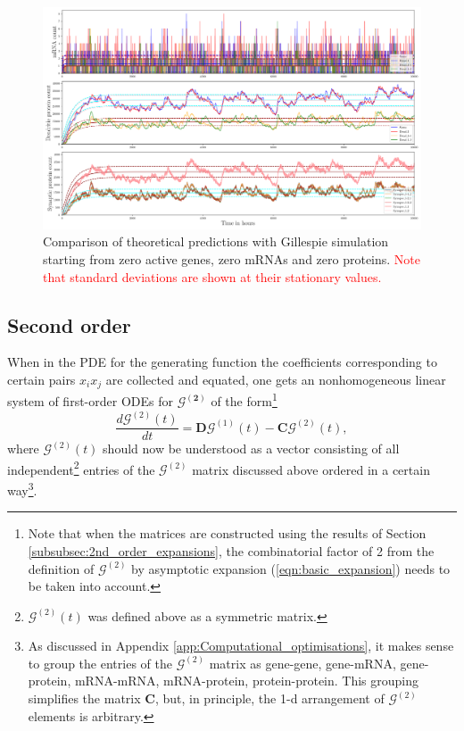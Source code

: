 \documentclass[a4paper, 11pt]{article}
\begin{document}
\begin{figure}
  \begin{center}
    \includegraphics[width=15cm]{img/protein_numbers.png}
  \end{center}  
  \caption{Comparison of theoretical predictions with Gillespie simulation starting from zero active genes, zero mRNAs and zero proteins. \textcolor{red}{Note that standard deviations are shown at their stationary values.}}
  \label{fig:Gillespie_simulation}
\end{figure}

\subsection{Second order}\label{subsec:NSC_second_order}
When in the PDE for the generating function the coefficients corresponding to certain pairs $x_ix_j$ are collected and equated, one gets an nonhomogeneous linear system of first-order ODEs for $\boldsymbol{\mathcal G^{(2)}}$ of the form\footnote{Note that when the matrices are constructed using the results of Section \ref{subsubsec:2nd_order_expansions}, the combinatorial factor of 2 from the definition of $\boldsymbol{\mathcal G}^{(2)}$ by asymptotic expansion (\ref{eqn:basic_expansion}) needs to be taken into account.}
\begin{equation}\label{o2_nonstat_ODE}
  \frac{d\boldsymbol{\mathcal G}^{(2)}(t)}{dt} = \mathbf D\boldsymbol{\mathcal G}^{(1)}(t) - \mathbf C\boldsymbol{\mathcal G}^{(2)}(t),
\end{equation}
where $\boldsymbol{\mathcal G}^{(2)}(t)$ should now be understood as a vector consisting of all independent\footnote{$\boldsymbol{\mathcal G}^{(2)}(t)$ was defined above as a symmetric matrix.} entries of the $\boldsymbol{\mathcal G}^{(2)}$ matrix discussed above ordered in a certain way\footnote{As discussed in Appendix \ref{app:Computational_optimisations}, it makes sense to group the entries of the $\boldsymbol{\mathcal G}^{(2)}$ matrix as gene-gene, gene-mRNA, gene-protein, mRNA-mRNA, mRNA-protein, protein-protein. This grouping simplifies the matrix $\mathbf C$, but, in principle, the 1-d arrangement of $\boldsymbol{\mathcal G}^{(2)}$ elements is arbitrary.}.
\end{document}
